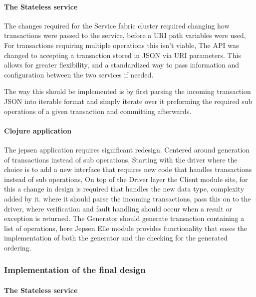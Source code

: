 \documentclass[a4paper,10pt,titlepage]{report}
\begin{document}
\paragraph*{The Stateless service}

The changes required for the Service fabric cluster required changing how transactions were passed to the service, before a URI path variables were used, For transactions requiring multiple operations this isn't viable, The API was changed to accepting a transaction stored in JSON via URI parameters. This allows for greater flexibility, and a standardized way to pass information and configuration between the two services if needed. 

The way this should be implemented is by first parsing the incoming transaction JSON into iterable format and simply iterate over it preforming the required sub operations of a given transaction and committing afterwards.

\paragraph*{Clojure application}

The jepsen application requires significant redesign. Centered around generation of transactions instead of sub operations, Starting with the driver where the choice is to add a new interface that requires new code that handles transactions instead of sub operations, On top of the Driver layer the Client module sits, for this a change in design is required that handles the new data type, complexity added by it. where it should parse the incoming transactions, pass this on to the driver, where verification and fault handling should occur when a result or exception is returned. The Generator should generate transaction containing a list of operations, here Jepsen Elle module provides functionality that eases the implementation of both the generator and the checking for the generated ordering.

\subsubsection{Implementation of the final design}

\paragraph*{The Stateless service}
\end{document}

